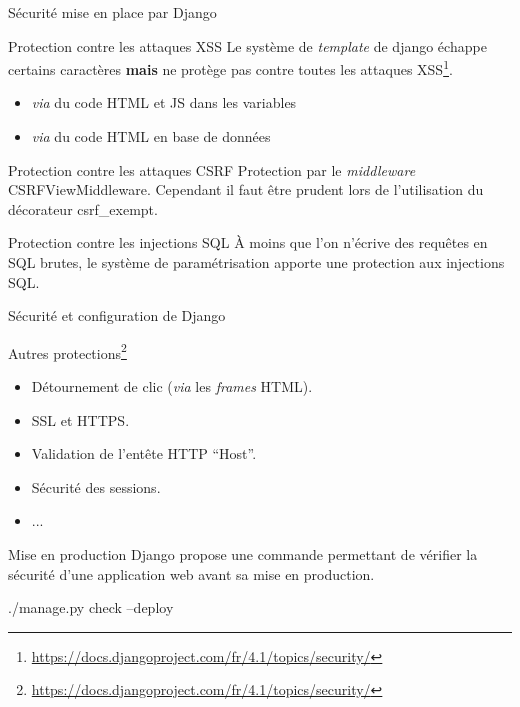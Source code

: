 \begin{frame}{Sécurité mise en place par Django}
  \begin{block}{Protection contre les attaques XSS}
    Le système de \textit{template} de django échappe certains
    caractères \textbf{mais} ne protège pas contre toutes les
    attaques XSS\footnote{\url{https://docs.djangoproject.com/fr/4.1/topics/security/}}.
    \begin{itemize}
    \item \textit{via} du code HTML et JS dans les variables
    \item \textit{via} du code HTML en base de données
    \end{itemize}
  \end{block}

  \begin{block}{Protection contre les attaques CSRF}
    Protection par le \textit{middleware} \textsf{CSRFViewMiddleware}.
    Cependant il faut être prudent lors de l'utilisation du décorateur
    \textsf{csrf\_exempt}.
  \end{block}

  \begin{block}{Protection contre les injections SQL}
    À moins que l'on n'écrive des requêtes en SQL brutes, le système
    de paramétrisation apporte une protection aux injections SQL.
  \end{block}
\end{frame}

\begin{frame}{Sécurité et configuration de Django}
  \begin{block}{Autres protections\footnote{\url{https://docs.djangoproject.com/fr/4.1/topics/security/}}}
    \begin{itemize}
    \item Détournement de clic (\textit{via} les \textit{frames} HTML).
    \item SSL et HTTPS.
    \item Validation de l'entête HTTP ``Host''.
    \item Sécurité des sessions.
    \item ...
    \end{itemize}
  \end{block}

  \begin{block}{Mise en production}
    Django propose une commande permettant de vérifier la sécurité
    d'une application web avant sa mise en production.
    
    \textsf{./manage.py check --deploy}
  \end{block}
\end{frame}

